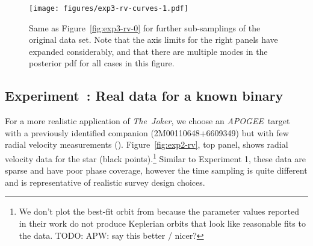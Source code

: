 \documentclass[manuscript, letterpaper]{aastex6}
\newcommand{\project}[1]{\textsl{#1}}
\newcommand{\acronym}[1]{{\small{#1}}}
\newcommand{\apogee}{\project{\acronym{APOGEE}}}
\newcommand{\samplername}{\project{The~Joker}}
\newcommand{\figname}{Figure}
\newcounter{expcounter}
\newcommand{\todo}[1]{{\color{red}TODO: #1}}
\begin{document}
\begin{figure}[p]
\begin{center}
\texttt{[image: figures/exp3-rv-curves-1.pdf]}
\end{center}
\caption{%
Same as \figname~\ref{fig:exp3-rv-0} for further sub-samplings of the original
data set.
Note that the axis limits for the right panels have expanded considerably, and
that there are multiple modes in the posterior pdf for all cases in this figure.
\label{fig:exp3-rv-1}}
\end{figure}




\subsection{Experiment~: Real data for a known binary}

For a more realistic application of \samplername, we choose an \apogee\ target
with a previously identified companion (2M00110648+6609349) but with few radial
velocity measurements (\citealt{Troup:2016}).
\figname~\ref{fig:exp2-rv}, top panel, shows radial velocity data for the star
(black points).\footnote{We don't plot the best-fit orbit from
\citealt{Troup:2016} because the parameter values reported in their work do not
produce Keplerian orbits that look like reasonable fits to the data.
\todo{APW: say this better / nicer?}}
Similar to Experiment 1, these data are sparse and have poor phase coverage,
however the time sampling is quite different and is representative of realistic
survey design choices.
\end{document}
